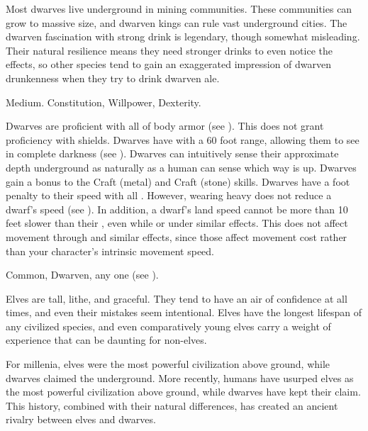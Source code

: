   Most dwarves live underground in mining communities.
  These communities can grow to massive size, and dwarven kings can rule vast underground cities.
  The dwarven fascination with strong drink is legendary, though somewhat misleading.
  Their natural resilience means they need stronger drinks to even notice the effects, so other species tend to gain an exaggerated impression of dwarven drunkenness when they try to drink dwarven ale.

   Medium.
    Constitution,  Willpower,  Dexterity.
  \begin{raggeditemize}
     Dwarves are proficient with all  of body armor (see ).
      This does not grant proficiency with shields.
     Dwarves have  with a 60 foot range, allowing them to see in complete darkness (see ).
     Dwarves can intuitively sense their approximate depth underground as naturally as a human can sense which way is up.
     Dwarves gain a  bonus to the Craft (metal) and Craft (stone) skills.
     Dwarves have a  foot penalty to their speed with all .
      However, wearing heavy  does not reduce a dwarf's speed (see ).
      In addition, a dwarf's land speed cannot be more than 10 feet slower than their , even while \slowed or under similar effects.
      This does not affect movement through  and similar effects, since those affect movement cost rather than your character's intrinsic movement speed.
  \end{raggeditemize}
   Common, Dwarven, any one  (see ).


  Elves are tall, lithe, and graceful.
  They tend to have an air of confidence at all times, and even their mistakes seem intentional.
  Elves have the longest lifespan of any civilized species, and even comparatively young elves carry a weight of experience that can be daunting for non-elves.

  For millenia, elves were the most powerful civilization above ground, while dwarves claimed the underground.
  More recently, humans have usurped elves as the most powerful civilization above ground, while dwarves have kept their claim.
  This history, combined with their natural differences, has created an ancient rivalry between elves and dwarves.

